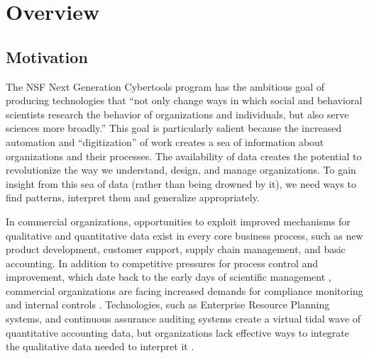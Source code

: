 
\section{Overview}

\subsection{Motivation}
\label{sec:motivation}

The NSF Next Generation Cybertools program has the ambitious goal of
producing technologies that ``not only change ways in which social and
behavioral scientists research the behavior of organizations and
individuals, but also serve sciences more broadly.'' This goal is
particularly salient because the increased automation and
``digitization'' of work creates a sea of information about
organizations and their processes.  The availability of data creates the
potential to revolutionize the way we understand, design, and manage
organizations.  To gain insight from this sea of data (rather than being
drowned by it), we need ways to find patterns, interpret them and
generalize appropriately.

In commercial organizations, opportunities to exploit improved mechanisms
for qualitative and quantitative data exist in every core business process,
such as new product development, customer support, supply chain management,
and basic accounting.  In addition to competitive pressures for process
control and improvement, which date back to the early days of scientific
management \cite{Pentland03b}, commercial organizations are facing
increased demands for compliance monitoring and internal controls
\cite{Hunton04}.  Technologies, such as Enterprise Resource Planning
systems, and continuous assurance auditing systems \cite{Varsarhelyi04}
create a virtual tidal wave of quantitative accounting data, but
organizations lack effective ways to integrate the qualitative data needed
to interpret it \cite{Hunton04}.

